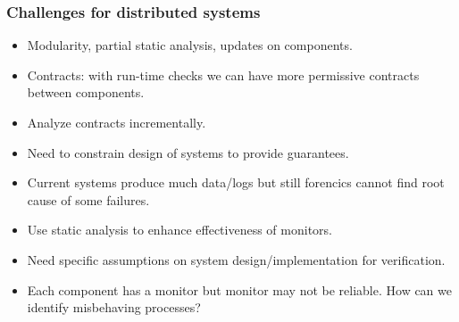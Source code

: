 \documentclass{beamer}
\begin{document}
\begin{frame}
  \frametitle{Challenges for distributed systems}

\begin{itemize}

\item Modularity, partial static analysis, updates on components.

\item Contracts: with run-time checks we can have more permissive contracts
  between components.

\item Analyze contracts incrementally.

\item Need to constrain design of systems to provide guarantees.

\item Current systems produce much data/logs but still forencics cannot find
  root cause of some failures.

\item Use static analysis to enhance effectiveness of monitors.

\item Need specific assumptions on system design/implementation for verification.

\item Each component has a monitor but monitor
  may not be reliable. How can we identify misbehaving processes?

\end{itemize}

\end{frame}
\end{document}
